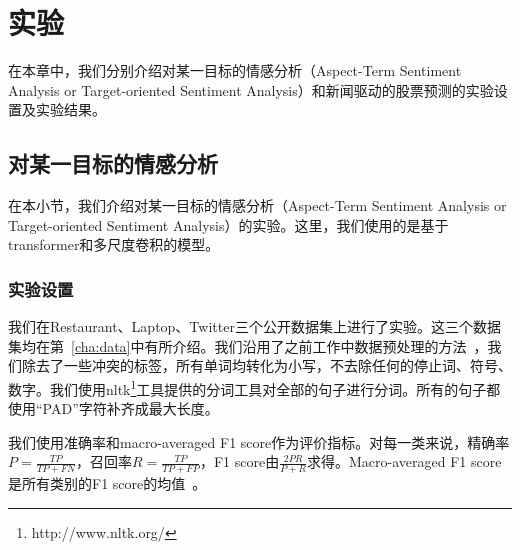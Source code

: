 \chapter{实验}
\label{cha:experiment}
在本章中，我们分别介绍对某一目标的情感分析（Aspect-Term Sentiment Analysis or Target-oriented Sentiment Analysis）和新闻驱动的股票预测的实验设置及实验结果。

\section{对某一目标的情感分析}
在本小节，我们介绍对某一目标的情感分析（Aspect-Term Sentiment Analysis or Target-oriented Sentiment Analysis）的实验。这里，我们使用的是基于transformer和多尺度卷积的模型。
\subsection{实验设置}
我们在Restaurant、Laptop、Twitter三个公开数据集上进行了实验。这三个数据集均在第~\ref{cha:data}中有所介绍。我们沿用了之前工作中数据预处理的方法~\cite{Xin2018Transformation,Tang2015Effective}，我们除去了一些冲突的标签，所有单词均转化为小写，不去除任何的停止词、符号、数字。我们使用nltk\footnote{http://www.nltk.org/}工具提供的分词工具对全部的句子进行分词。所有的句子都使用“PAD”字符补齐成最大长度。

我们使用准确率和macro-averaged F1 score作为评价指标。对每一类来说，精确率$P=\frac{TP}{TP+FN}$，召回率$R=\frac{TP}{TP+FP}$，F1 score由$\frac{2PR}{P+R}$求得。Macro-averaged F1 score是所有类别的F1 score的均值~\cite{Tang2015Effective}。

